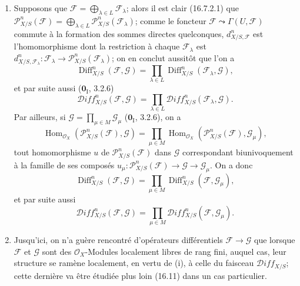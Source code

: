 \begin{remarks}[16.8.11]
\label{IV.16.8.11}
\begin{enumerate}
  \item[(i)] Supposons que
  $\mathscr{F}=\bigoplus_{\lambda\in L}\mathscr{F}_\lambda$; alors il est
  clair (16.7.2.1) que
  $\mathscr{P}_{X/S}^n(\mathscr{F})=
  \bigoplus_{\lambda\in L}\mathscr{P}_{X/S}^n(\mathscr{F}_\lambda)$; comme le
  foncteur $\mathscr{F}\leadsto\Gamma(U,\mathscr{F})$ commute à la formation
  des sommes directes quelconques, $d_{X/S,\mathscr{F}}^n$ est
  l'homomorphisme dont la restriction à chaque $\mathscr{F}_\lambda$ est
  $d_{X/S,\mathscr{F}_\lambda}^n:\mathscr{F}_\lambda\to\mathscr{P}_{X/S}^n(\mathscr{F}_\lambda)$;
  on en conclut aussitôt que l'on a
  \[
    \operatorname{Diff}_{X/S}^n(\mathscr{F},\mathscr{G})
    =\prod_{\lambda\in L}
    \operatorname{Diff}_{X/S}^n(\mathscr{F}_\lambda,\mathscr{G}),
  \]
  et par suite aussi ($\mathbf{0}_{\mathrm I}$, 3.2.6)
  \[
    \mathscr{D}\!iff_{X/S}^n(\mathscr{F},\mathscr{G})
    =\prod_{\lambda\in L}
    \mathscr{D}\!iff_{X/S}^n(\mathscr{F}_\lambda,\mathscr{G}).
  \]
  Par ailleurs, si $\mathscr{G}=\prod_{\mu\in M}\mathscr{G}_\mu$
  ($\mathbf{0}_{\mathrm I}$, 3.2.6), on a
  \[
    \operatorname{Hom}_{\mathcal{O}_X}
    (\mathscr{P}_{X/S}^n(\mathscr{F}),\mathscr{G})
    =\prod_{\mu\in M}\operatorname{Hom}_{\mathcal{O}_X}
    (\mathscr{P}_{X/S}^n(\mathscr{F}),\mathscr{G}_\mu),
  \]
  tout homomorphisme $u$ de $\mathscr{P}_{X/S}^n(\mathscr{F})$ dans
  $\mathscr{G}$ correspondant biunivoquement à la famille de ses composés
  $u_\mu:\mathscr{P}_{X/S}^n(\mathscr{F})\to\mathscr{G}\to\mathscr{G}_\mu$.
  On a donc
  \[
    \operatorname{Diff}_{X/S}^n(\mathscr{F},\mathscr{G})
    =\prod_{\mu\in M}
    \operatorname{Diff}_{X/S}^n(\mathscr{F},\mathscr{G}_\mu),
  \]
  et par suite aussi
  \[
    \mathscr{D}\!iff_{X/S}^n(\mathscr{F},\mathscr{G})
    =\prod_{\mu\in M}
    \mathscr{D}\!iff_{X/S}^n(\mathscr{F},\mathscr{G}_\mu).
  \]
  \item[(ii)] Jusqu'ici, on n'a guère rencontré d'opérateurs différentiels
  $\mathscr{F}\to\mathscr{G}$ que lorsque $\mathscr{F}$ et $\mathscr{G}$ sont
  des $\mathcal{O}_X$-Modules localement libres de rang fini, auquel cas, leur
  structure se ramène localement, en vertu de (i), à celle du faisceau
  $\mathscr{D}\!iff_{X/S}$; cette dernière va être étudiée plus loin (16.11)
  dans un cas particulier.
\end{enumerate}
\end{remarks}

